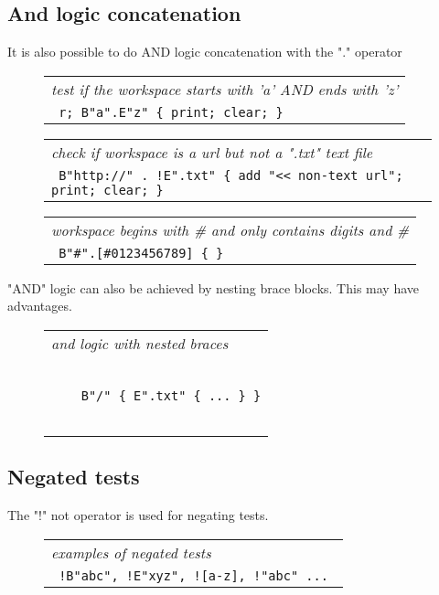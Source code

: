 \documentclass[a4paper,12pt]{article}
\begin{document}
\subsection{And logic concatenation}

  It is also possible to do AND logic concatenation with the "." operator
 \begin{figure}
 \begin{tabular}{ l }
 \emph{ test if the workspace starts with 'a' AND ends with 'z' } \\ 
 \verb| r; B"a".E"z" { print; clear; } |
 \end{tabular} 
 \end{figure}
 \begin{figure}
 \begin{tabular}{ l }
 \emph{ check if workspace is a url but not a ".txt" text file  } \\ 
 \verb| B"http://" . !E".txt" { add "<< non-text url"; print; clear; } |
 \end{tabular} 
 \end{figure}
 \begin{figure}
 \begin{tabular}{ l }
 \emph{ workspace begins with \# and only contains digits and \#  } \\ 
 \verb| B"#".[#0123456789] { } |
 \end{tabular} 
 \end{figure}

  "AND" logic can also be achieved by nesting brace blocks. This
  may have advantages.
 \begin{figure}
 \begin{tabular}{ l }
 \emph{ and logic with nested braces } \\ 
 \begin{lstlisting}[breaklines] 

    B"/" { E".txt" { ... } }
  
 \end{lstlisting} 
 \end{tabular} 

 \end{figure}

\subsection{Negated tests}

  The "!" not operator is used for negating tests.
 \begin{figure}
 \begin{tabular}{ l }
 \emph{ examples of negated tests } \\ 
 \verb| !B"abc", !E"xyz", ![a-z], !"abc" ... |
 \end{tabular} 
 \end{figure}
\end{document}
